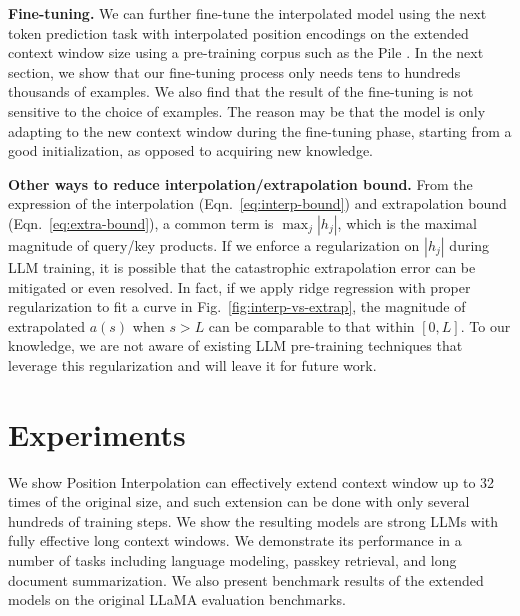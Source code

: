 \documentclass{article} %
\theoremstyle{definition}
\newcommand{\ignore}[1]{}
\begin{document}
\ignore{[Something something resolution, optional] Our method accommodates more input tokens by interpolating the position encoding in the original range of $[0, c)$, resulting in a more densely distributed position encoding. As our experimental results indicate, Transformer models demonstrate a remarkable ability to handle vastly denser position encodings that come with significantly larger context windows without much fine-tuning. }

{\noindent \textbf{Fine-tuning.}} We can further fine-tune the interpolated model using the next token prediction task with interpolated position encodings on the extended context window size using a pre-training corpus such as the Pile \citep{pile}. In the next section, we show that our fine-tuning process only needs tens to hundreds thousands of examples.  We also find that the result of the fine-tuning is not sensitive to the choice of examples. The reason may be that the model is only adapting to the new context window during the fine-tuning phase, starting from a good initialization, as opposed to acquiring new knowledge. 

{\noindent \textbf{Other ways to reduce interpolation/extrapolation bound.}} From the expression of the interpolation (Eqn.~\ref{eq:interp-bound}) and extrapolation bound (Eqn.~\ref{eq:extra-bound}), a common term is $\max_j |h_j|$, which is the maximal magnitude of query/key products. If we enforce a regularization on  $|h_j|$ during LLM training, it is possible that the catastrophic extrapolation error can be mitigated or even resolved. In fact, if we apply ridge regression with proper regularization to fit a curve in Fig.~\ref{fig:interp-vs-extrap}, the magnitude of extrapolated $a(s)$ when $s > L$ can be comparable to that within $[0,L]$. To our knowledge, we are not aware of existing LLM pre-training techniques that leverage this regularization and will leave it for future work. 

\section{Experiments}

We show Position Interpolation can effectively extend context window up to 32 times of the original size, and such extension can be done 
with only several hundreds of training steps.
We show the resulting models are strong LLMs with fully effective long context windows. 
We demonstrate its performance in a number of tasks including language modeling, passkey retrieval, and 
long document summarization.
We also present benchmark results of the extended models on the original LLaMA evaluation benchmarks.
\end{document}
